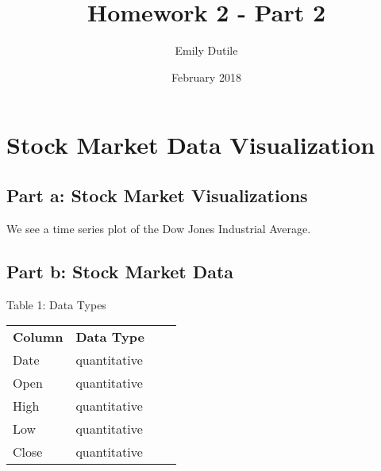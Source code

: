 \documentclass{neu_handout}
\title{Homework 2 - Part 2}
\author{Emily Dutile}
\date{February 2018}
\begin{document}
\section*{Stock Market Data Visualization}

\subsection*{Part a: Stock Market Visualizations}
We see a time series plot of the Dow Jones Industrial Average.

\subsection*{Part b: Stock Market Data}

\begin{center}
Table 1: Data Types
\end{center}
\begin{center} 
\begin{tabular}[h]{l l l l}
\textbf{Column} & \textbf{Data Type} \\
Date & quantitative \\
Open & quantitative \\ 
High & quantitative \\
Low & quantitative \\
Close & quantitative \\

\end{tabular}
\end{center}
\end{document}
